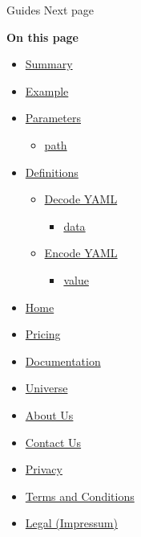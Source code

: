 { Guides } { Next page }

\textbf{On this page}

\begin{itemize}
\tightlist
\item
  \hyperref[summary]{Summary}
\item
  \hyperref[example]{Example}
\item
  \hyperref[parameters]{Parameters}

  \begin{itemize}
  \tightlist
  \item
    \hyperref[parameters-path]{path}
  \end{itemize}
\item
  \hyperref[definitions]{Definitions}

  \begin{itemize}
  \tightlist
  \item
    \hyperref[definitions-decode]{Decode YAML}

    \begin{itemize}
    \tightlist
    \item
      \hyperref[definitions-decode-data]{data}
    \end{itemize}
  \item
    \hyperref[definitions-encode]{Encode YAML}

    \begin{itemize}
    \tightlist
    \item
      \hyperref[definitions-encode-value]{value}
    \end{itemize}
  \end{itemize}
\end{itemize}

\begin{itemize}
\tightlist
\item
  \href{/}{Home}
\item
  \href{/pricing/}{Pricing}
\item
  \href{/docs/}{Documentation}
\item
  \href{/universe/}{Universe}
\item
  \href{/about/}{About Us}
\item
  \href{/contact/}{Contact Us}
\item
  \href{/privacy/}{Privacy}
\item
  \href{https://typst.app/terms}{Terms and Conditions}
\item
  \href{/legal/}{Legal (Impressum)}
\end{itemize}


